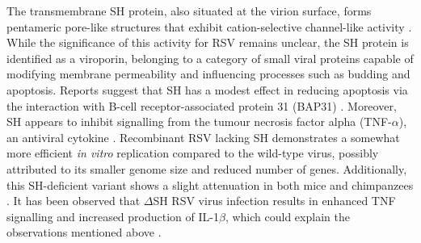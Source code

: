 The transmembrane SH protein, also situated at the virion surface, forms pentameric pore-like structures that exhibit cation-selective channel-like activity \cite{Carter2010DirectPermeability, Gan2012TheChannels}. While the significance of this activity for RSV remains unclear, the SH protein is identified as a viroporin, belonging to a category of small viral proteins capable of modifying membrane permeability and influencing processes such as budding and apoptosis. Reports suggest that SH has a modest effect in reducing apoptosis via the interaction with B-cell receptor-associated protein 31 (BAP31) \cite{Fuentes2007FunctionProtein}. Moreover, SH appears to inhibit signalling from the tumour necrosis factor alpha (TNF-\(\alpha\)), an antiviral cytokine \cite{Fuentes2007FunctionProtein}. Recombinant RSV lacking SH demonstrates a somewhat more efficient \textit{in vitro} replication compared to the wild-type virus, possibly attributed to its smaller genome size and reduced number of genes. Additionally, this SH-deficient variant shows a slight attenuation in both mice and chimpanzees \cite{Whitehead1999RecombinantChimpanzees}. It has been observed that \(\Delta\)SH RSV virus infection results in enhanced TNF signalling and increased production of IL-1\(\beta\), which could explain the observations mentioned above \cite{Pollock2017ModulationProtein}. 

